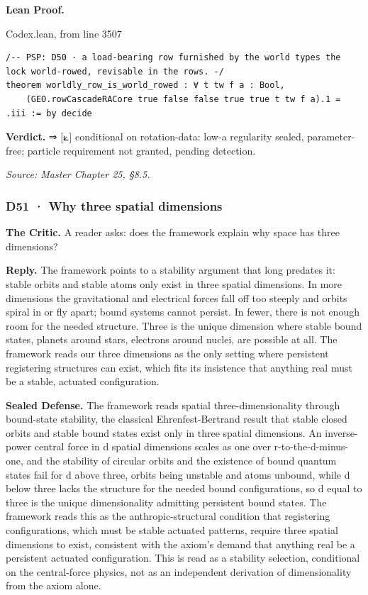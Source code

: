 \documentclass[10pt,twocolumn]{article}
\begin{document}
\textbf{Lean Proof.}

\begin{leanexcerpt}{Codex.lean, from line 3507}
\begin{lstlisting}[style=leanx,firstnumber=3507]
/-- PSP: D50 · a load-bearing row furnished by the world types the lock world-rowed, revisable in the rows. -/
theorem worldly_row_is_world_rowed : ∀ t tw f a : Bool,
    (GEO.rowCascadeRACore true false false true true t tw f a).1 = .iii := by decide
\end{lstlisting}
\end{leanexcerpt}

\textbf{Verdict.} ⇒ {[}⟀{]} conditional on rotation-data: low-a
regularity sealed, parameter-free; particle requirement not granted,
pending detection.

\emph{Source: Master Chapter 25, §8.5.}

\hypertarget{d51-why-three-spatial-dimensions}{%
\subsubsection{D51 · Why three spatial
dimensions}\label{d51-why-three-spatial-dimensions}}

\textbf{The Critic.} A reader asks: does the framework explain why space
has three dimensions?

\textbf{Reply.} The framework points to a stability argument that long
predates it: stable orbits and stable atoms only exist in three spatial
dimensions. In more dimensions the gravitational and electrical forces
fall off too steeply and orbits spiral in or fly apart; bound systems
cannot persist. In fewer, there is not enough room for the needed
structure. Three is the unique dimension where stable bound states,
planets around stars, electrons around nuclei, are possible at all. The
framework reads our three dimensions as the only setting where
persistent registering structures can exist, which fits its insistence
that anything real must be a stable, actuated configuration.

\textbf{Sealed Defense.} The framework reads spatial
three-dimensionality through bound-state stability, the classical
Ehrenfest-Bertrand result that stable closed orbits and stable bound
states exist only in three spatial dimensions. An inverse-power central
force in d spatial dimensions scales as one over r-to-the-d-minus-one,
and the stability of circular orbits and the existence of bound quantum
states fail for d above three, orbits being unstable and atoms unbound,
while d below three lacks the structure for the needed bound
configurations, so d equal to three is the unique dimensionality
admitting persistent bound states. The framework reads this as the
anthropic-structural condition that registering configurations, which
must be stable actuated patterns, require three spatial dimensions to
exist, consistent with the axiom's demand that anything real be a
persistent actuated configuration. This is read as a stability
selection, conditional on the central-force physics, not as an
independent derivation of dimensionality from the axiom alone.
\end{document}
